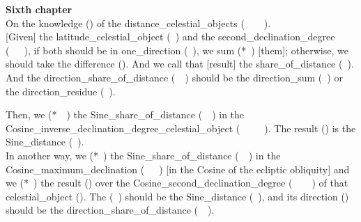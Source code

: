 \noindent\normalmarginpar{}
\medskip

\noindent\normalmarginpar{}

\clearpage{}

\textbf{Sixth chapter} \\
On the \gls{knowledge} (\marifat) of the \glspl{distance_celestial_object} (\bud\idafaconsonant\ \kawakib\ \az\ \muaddil\ \alnahar).   
\\[0.5\baselineskip]

\noindent\reversemarginpar{}%
{[Given]} the \gls{latitude_celestial_object} (\ard\idafaconsonant\ \kawkab) and the \gls{second_declination_degree} (\mayl\idafaconsonant\ \thani\idafavowel\ \daraji\idafavowel\ \uy), if both should be in \gls{one_direction} (\yik\ \jahat), we \gls{sum} (*\jam\ \kardan) [them]; otherwise, we should take the \gls{difference} (\tafadul). And we call that [result] the \gls{share_of_distance} (\hissi\idafavowel\ \bud). And the \gls{direction_share_of_distance} (\jahat\idafaconsonant\ \hissi\idafavowel\ \bud) should be the \gls{direction_sum} (\jahat\idafaconsonant\ \majmu) or the \gls{direction_residue} (\jahat\idafaconsonant\ \fadla). 
\label{passage_1_english_persian} 
\medskip

\noindent\reversemarginpar{}%
Then, we  (*\munhatt\idafaconsonant\ \darb\ \kardan) the \gls{Sine_share_of_distance} (\jayb\idafaconsonant\ \hissi\idafavowel\ \bud) in the \gls{Cosine_inverse_declination_degree_celestial_object} (\jayb\idafaconsonant\ \tamam\idafaconsonant\ \mayl\idafaconsonant\ \mankus\idafaconsonant\ \daraji\idafavowel\ \kawkab). The \gls{result} (\hasil) is the \gls{Sine_distance} (\jayb\idafaconsonant\ \bud). 
\\[\baselineskip]

\noindent\reversemarginpar{}%
In another way, we  (*\darb\ \kardan) the \gls{Sine_share_of_distance} (\jayb\idafaconsonant\ \hissi\idafavowel\ \bud) in the \gls{Cosine_maximum_declination} (\jayb\idafaconsonant\ \tamam\idafaconsonant\ \mayl\idafaconsonant\ \kulli) [\ie  in the Cosine of the ecliptic obliquity] and we  (*\qismat\ \kardan) the \gls{result} (\hasil) over the \gls{Cosine_second_declination_degree} (\jayb\idafaconsonant\ \tamam\idafaconsonant\ \mayl\idafaconsonant\ \thani\idafavowel\ \daraji) of that \gls{celestial_object} (\kawkab). The  (\kharij\idafaconsonant\ \qismat) should be the \gls{Sine_distance} (\jayb\idafaconsonant\ \bud), and its \gls{direction} (\jahat)  should be the \gls{direction_share_of_distance} (\jahat\idafaconsonant\ \hissi\idafavowel\ \bud). 
\medskip

